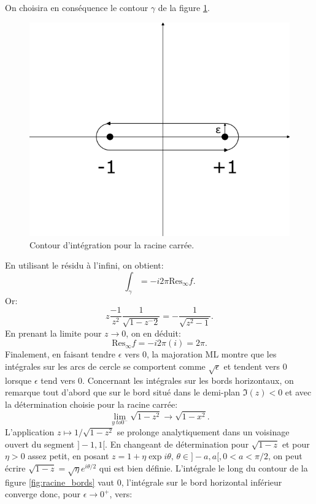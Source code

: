 On choisira en conséquence le contour $\gamma$ de la figure \ref{fig:racine_carree}.
\begin{figure}
    \centering
    \includegraphics[scale=0.5]{images/racine_carree.png}
    \caption{Contour d'intégration pour la racine carrée.}
    \label{fig:racine_carree}
\end{figure}
En utilisant le résidu à l'infini, on obtient:
\[
\int_{\gamma} = - i 2 \pi \text{Res}_\infty f.
\]
Or:
\[
z\frac{-1}{z^2} \frac{1}{\sqrt{1-z^-2}} = -\frac{1}{\sqrt{z^2-1}}.
\]
En prenant la limite pour $z \to 0$, on en déduit:
\[
\text{Res}_\infty f = -i 2 \pi (i) = 2 \pi.
\]
Finalement, en faisant tendre $\epsilon$ vers $0$, la majoration ML montre que les intégrales sur les arcs de cercle se comportent comme $\sqrt{\epsilon}$ et tendent vers $0$ lorsque $\epsilon$ tend vers $0$. Concernant les intégrales sur les bords horizontaux, on remarque tout d'abord que sur le bord situé dans le demi-plan $\Im(z) < 0$ et avec la détermination choisie pour la racine carrée:
\begin{equation}
    \lim_{y \ to 0^-} \sqrt{1-z^2} \to \sqrt{1-x^2}.
\end{equation}
L'application $z \mapsto 1/\sqrt{1-z^2}$ se prolonge analytiquement dans un voisinage ouvert du segment $]-1,1[.$
En changeant de détermination pour $\sqrt{1-z}$ et pour $\eta>0$ assez petit, en posant $z= 1 + \eta \exp{i \theta},\, \theta \in ]-a,a[, 0 < a < \pi/2$, on peut écrire $\sqrt{1-z} = \sqrt{\eta} e^{i \theta/2}$ qui est bien définie.
L'intégrale le long du contour de la figure \ref{fig:racine_bords} vaut  $0$, l'intégrale sur le bord horizontal inférieur converge donc, pour $\epsilon \to 0^+$, vers:
